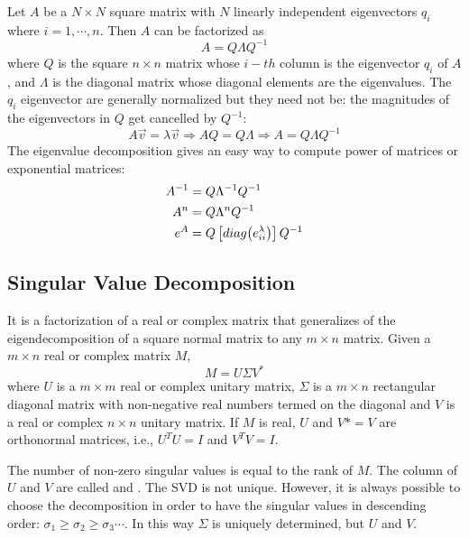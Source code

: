 Let $A$ be a $N\times N$ square matrix with $N$ linearly independent eigenvectors $q_i$ where $i=1, \cdots, n$. Then $A$ can be factorized as 
\begin{equation}
A = Q \Lambda Q^{-1}
\end{equation}
where $Q$ is  the square $n\times n$ matrix whose $i-th$ column is the eigenvector $q_i$ of $A$, and $\Lambda$ is the diagonal matrix whose diagonal elements are the eigenvalues. The $q_i$ eigenvector are generally normalized but they need not be: the magnitudes of the eigenvectors in $Q$ get cancelled by $Q^{-1}$:
\begin{equation}
A\vec{v} = \lambda \vec{v}\Rightarrow AQ = Q\Lambda \Rightarrow A = Q\Lambda Q^{-1}
\end{equation}
The eigenvalue decomposition gives an easy way to compute power of matrices or exponential matrices:
\begin{equation}
\begin{aligned}
A^{-1} &= Q\Lambda^{-1}Q^{-1}\\
A^n    &=  Q\Lambda^{n}Q^{-1}\\
e^A    &=  Q\left[diag\br{e^\lambda_{ii}}\right]Q^{-1}\\
\end{aligned}
\end{equation}

\subsection{Singular Value Decomposition}
\label{SVD}
It is a factorization of a real or complex matrix that generalizes of the eigendecomposition of a square normal matrix to any $m\times n$ matrix. Given a $m\times n$ real or complex matrix $M$,
\begin{equation}
M = U \Sigma V^*
\end{equation}
where $U$ is a $m \times m$ real or complex unitary matrix, $\Sigma$ is a $m \times n$ rectangular diagonal matrix with non-negative real numbers termed  on the diagonal and $V$ is a real or complex $n\times n$ unitary matrix. If $M$ is real, $U$ and $V*=V$ are orthonormal matrices, i.e., $U^TU=I$ and $V^TV=I$.

The number of non-zero singular values is equal to the rank of $M$. The column of $U$ and $V$ are called  and . The SVD is not unique. However, it is always possible to choose the decomposition in order to have the singular values in descending order: $\sigma_1 \ge \sigma_2 \ge \sigma_3 \cdots$. In this way $\Sigma$ is uniquely determined, but  $U$ and $V$.

